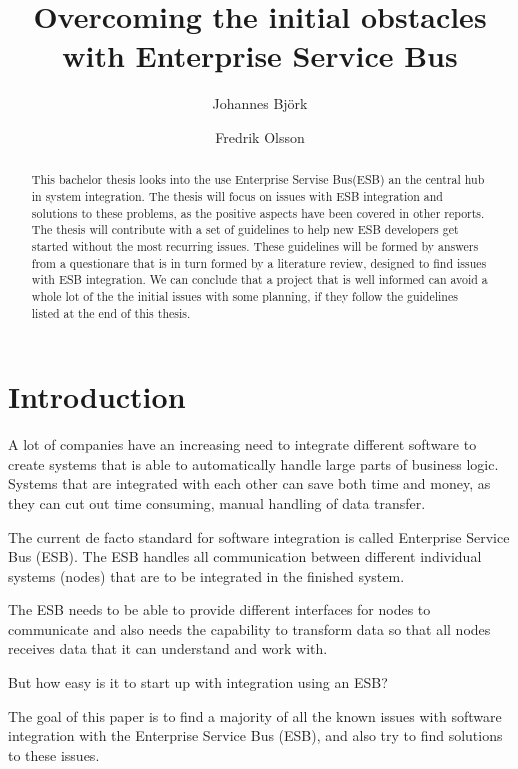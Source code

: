 \documentclass{llncs}
\title{Overcoming the initial obstacles with Enterprise Service Bus}
\author{Johannes Björk \inst{1} \and Fredrik Olsson \inst{1}}
\institute{
	Blekinge Institute of Technology \\
	\email{johannes@johannesbjork.se}, \email{spooky.bender@gmail.com}
}
\begin{document}
\maketitle

\begin{abstract}
This bachelor thesis looks into the use Enterprise Servise Bus(ESB) an the central hub in system integration. The thesis will focus on issues with ESB integration and solutions to these problems, as the positive aspects have been covered in other reports. 
The thesis will contribute with a set of guidelines to help new ESB developers get started without the most recurring issues. These guidelines will be formed by answers from a questionare that is in turn formed by a literature review, designed to find issues with ESB integration.
We can conclude that a project that is well informed can avoid a whole lot of the the initial issues with some planning, if they follow the guidelines listed at the end of this thesis.

\end{abstract}

\newpage
\setcounter{tocdepth}{3}
\newpage

\section{Introduction}
A lot of companies have an increasing need to integrate different software to create systems that is able to automatically handle large parts of business logic. Systems that are integrated with each other can save both time and money, as they can cut out time consuming, manual handling of data transfer.

The current de facto standard for software integration is called Enterprise Service Bus (ESB). The ESB handles all communication between different individual systems (nodes) that are to be integrated in the finished system.

The ESB needs to be able to provide different interfaces for nodes to communicate and also needs the capability to transform data so that all nodes receives data that it can understand and work with.

But how easy is it to start up with integration using an ESB?

The goal of this paper is to find a majority of all the known issues with software integration with the Enterprise Service Bus (ESB), and also try to find solutions to these issues.
\end{document}
